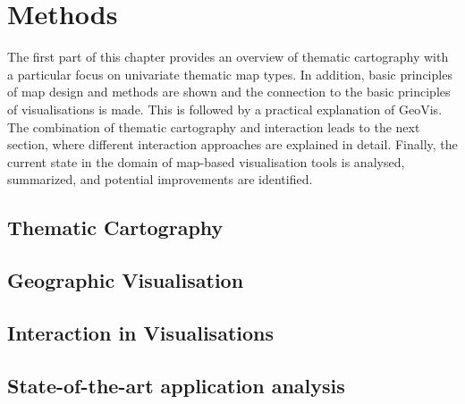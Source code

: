 \section{Methods}
\label{s:methods}
The first part of this chapter provides an overview of thematic cartography with a particular focus on univariate thematic map types. In addition, basic principles of map design and methods are shown and the connection to the basic principles of visualisations is made. This is followed by a practical explanation of \ac{GeoVis}.
The combination of thematic cartography and interaction leads to the next section, where different interaction approaches are explained in detail. Finally, the current state in the domain of map-based visualisation tools is analysed, summarized, and potential improvements are identified.

\subsection{Thematic Cartography}
\label{s:cartography}


\subsection{Geographic Visualisation}
\label{s:geovis-practical}


\subsection{Interaction in Visualisations}
\label{s:interaction}


\subsection{State-of-the-art application analysis}
